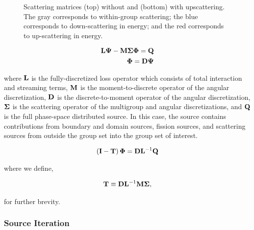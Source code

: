 \begin{figure}
\begin{subfigure}[b]{0.58\textwidth}
	\end{subfigure}
\caption[Scattering matrices with and without upscattering]{Scattering matrices (top) without and (bottom) with upscattering. The gray corresponds to within-group scattering; the blue corresponds to down-scattering in energy; and the red corresponds to up-scattering in energy.}
\label{fig::Sn_Solution_Iterative_scattmatrix}
\end{figure}

\begin{equation}
\label{eq::Sn_full_sol_ops}
\begin{aligned}
{\bf L} {\bf \Psi} - {\bf M} {\bf \Sigma} {\bf \Phi}  =    {\bf Q} \\
{\bf \Phi} =  {\bf D} {\bf \Psi}
\end{aligned}
\end{equation}

\noindent where ${\bf L}$ is the fully-discretized loss operator which consists of total interaction and streaming terms, ${\bf M}$ is the moment-to-discrete operator of the angular discretization, ${\bf D}$ is the discrete-to-moment operator of the angular discretization, ${\bf \Sigma}$ is the scattering operator of the multigroup and angular discretizations, and ${\bf Q}$ is the full phase-space distributed source. In this case, the source contains contributions from boundary and domain sources, fission sources, and scattering sources from outside the group set into the group set of interest.



\begin{equation}
\label{eq::Sn_full_sol_moments_only}
\left( {\bf I} -{\bf T} \right) {\bf \Phi} =  {\bf D} {\bf L}^{-1}  {\bf Q} 
\end{equation}

\noindent where we define,

\begin{equation}
\label{eq::Sn_trans_op_T}
{\bf T} \equiv {\bf D} {\bf L}^{-1}{\bf M} {\bf \Sigma} ,
\end{equation}

\noindent for further brevity.



\subsubsection{Source Iteration}
\label{sec::Sn_Solution_Iterative_SI}

